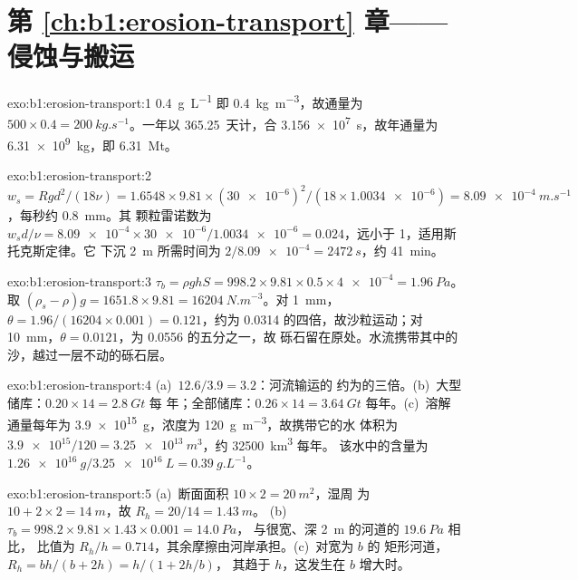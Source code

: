 \section*{第 \ref{ch:b1:erosion-transport} 章——侵蚀与搬运}

\begin{solution}{exo:b1:erosion-transport:1}
\qty{0.4}{g.L^{-1}} 即 \qty{0.4}{kg.m^{-3}}，故通量为 $500 \times 0.4 =
\qty{200}{kg.s^{-1}}$。一年以 \num{365.25}~天计，合
\qty{3.156e7}{s}，故年通量为 \qty{6.31e9}{kg}，即
\qty{6.31}{Mt}。
\end{solution}

\begin{solution}{exo:b1:erosion-transport:2}
$w_s = R g d^2/(18\nu) = 1.6548 \times 9.81 \times (\num{30e-6})^2/(18 \times
\num{1.0034e-6}) = \qty{8.09e-4}{m.s^{-1}}$，每秒约 \qty{0.8}{mm}。其
颗粒雷诺数为 $w_s d/\nu = \num{8.09e-4} \times
\num{30e-6}/\num{1.0034e-6} = 0.024$，远小于 1，适用斯托克斯定律。它
下沉 \qty{2}{m} 所需时间为 $2/\num{8.09e-4} = \qty{2472}{s}$，约
\qty{41}{min}。
\end{solution}

\begin{solution}{exo:b1:erosion-transport:3}
$\tau_b = \rho g h S = 998.2 \times 9.81 \times 0.5 \times \num{4e-4} =
\qty{1.96}{Pa}$。取 $(\rho_s - \rho) g = 1651.8 \times 9.81 =
\qty{16204}{N.m^{-3}}$。对 \qty{1}{mm}，$\theta = 1.96/(16204 \times 0.001) =
0.121$，约为 \num{0.0314} 的四倍，故沙粒运动；对
\qty{10}{mm}，$\theta = 0.0121$，为 \num{0.0556} 的五分之一，故
砾石留在原处。水流携带其中的沙，越过一层不动的砾石层。
\end{solution}

\begin{solution}{exo:b1:erosion-transport:4}
(a)~$12.6/3.9 = 3.2$：河流输运的
约为的三倍。(b)~大型储库：$0.20 \times 14 = \qty{2.8}{Gt}$ 每
年；全部储库：$0.26 \times 14 = \qty{3.64}{Gt}$ 每年。(c)~溶解
通量每年为 \qty{3.9e15}{g}，浓度为 \qty{120}{g.m^{-3}}，故携带它的水
体积为 $\num{3.9e15}/120 = \qty{3.25e13}{m^3}$，约 \qty{32500}{km^3} 每年。
该水中的含量为 $\qty{1.26e16}{g}/\qty{3.25e16}{L} =
\qty{0.39}{g.L^{-1}}$。
\end{solution}

\begin{solution}{exo:b1:erosion-transport:5}
(a)~断面面积 $10 \times 2 = \qty{20}{m^2}$，湿周
为 $10 + 2 \times 2 = \qty{14}{m}$，故 $R_h = 20/14 = \qty{1.43}{m}$。
(b)~$\tau_b = 998.2 \times 9.81 \times 1.43 \times 0.001 = \qty{14.0}{Pa}$，
与很宽、深 \qty{2}{m} 的河道的 $\qty{19.6}{Pa}$ 相比，
比值为 $R_h/h = 0.714$，其余摩擦由河岸承担。(c)~对宽为 $b$ 的
矩形河道，$R_h = bh/(b + 2h) = h/(1 + 2h/b)$，
其趋于 $h$，这发生在 $b$ 增大时。
\end{solution}

